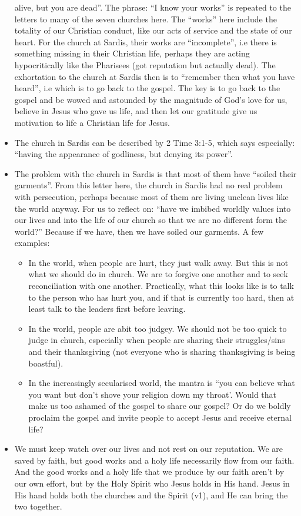 \begin{itemize}
{  alive, but you are dead''.  The phrase: ``I know your works'' is repeated
  to the letters to many of the seven churches here.  The ``works'' here
  include the totality of our Christian conduct, like our acts of service and
  the state of our heart.  For the church at Sardis, their works are
  ``incomplete'', i.e there is something missing in their Christian life,
  perhaps they are acting hypocritically like the Pharisees (got reputation
  but actually dead).  The exhortation to the church at Sardis then is to
  ``remember then what you have heard'', i.e which is to go back to the
  gospel.  The key is to go back to the gospel and be wowed and astounded by
  the magnitude of God's love for us, believe in Jesus who gave us life, and
  then let our gratitude give us motivation to life a Christian life for
  Jesus.}
  \item{The church in Sardis can be described by 2 Time 3:1-5, which says
  especially: ``having the appearance of godliness, but denying its power''.
  }
  \item{The problem with the church in Sardis is that most of them have
  ``soiled their garments''.  From this letter here, the church in Sardis had
  no real problem with persecution, perhaps because most of them are living
  unclean lives like the world anyway.  For us to reflect on: ``have we
  imbibed worldly values into our lives and into the life of our church so
  that we are no different form the world?'' Because if we have, then we have
  soiled our garments. A few examples:
  \begin{itemize}
    \item{In the world, when people are hurt, they just walk away.  But this
    is not what we should do in church.  We are to forgive one another and to
    seek reconciliation with one another.  Practically, what this looks like
    is to talk to the person who has hurt you, and if that is currently too
    hard, then at least talk to the leaders first before leaving.}
    \item{In the world, people are abit too judgey.  We should not be too
    quick to judge in church, especially when people are sharing their
    struggles/sins and their thanksgiving (not everyone who is sharing
    thanksgiving is being boastful).}
    \item{In the increasingly secularised world, the mantra is ``you can
    believe what you want but don't shove your religion down my throat'.
    Would that make us too ashamed of the gospel to share our gospel?  Or do
    we boldly proclaim the gospel and invite people to accept Jesus and
    receive eternal life?} 
  \end{itemize}}
  \item{We must keep watch over our lives and not rest on our reputation.  We
  are saved by faith, but good works and a holy life necessarily flow from
  our faith.  And the good works and a holy life that we produce by our faith
  aren't by our own effort, but by the Holy Spirit who Jesus holds in His
  hand.  Jesus in His hand holds both the churches and the Spirit (v1), and
  He can bring the two together.}
\end{itemize}